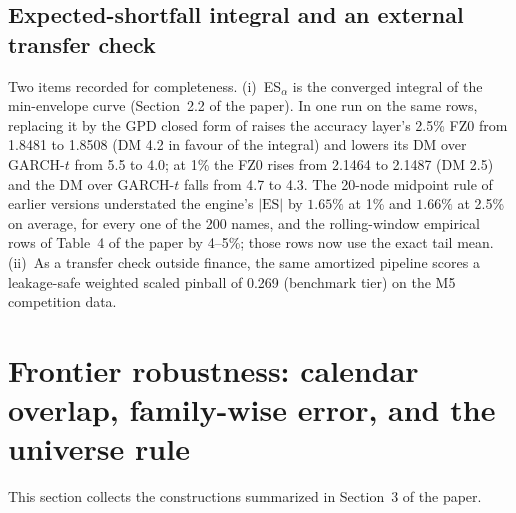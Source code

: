 \documentclass[11pt]{article}
\newcommand{\ES}{\mathrm{ES}}
\begin{document}
\subsection*{Expected-shortfall integral and an external transfer check}
Two items recorded for completeness. (i)~ES$_\alpha$ is the converged integral of the min-envelope curve (Section~2.2 of the paper). In one run on the same rows, replacing it by the GPD closed form of \citet{mcneilfrey2000} raises the accuracy layer's 2.5\% FZ0 from 1.8481 to 1.8508 (DM 4.2 in favour of the integral) and lowers its DM over GARCH-$t$ from 5.5 to 4.0; at 1\% the FZ0 rises from 2.1464 to 2.1487 (DM 2.5) and the DM over GARCH-$t$ falls from 4.7 to 4.3. The 20-node midpoint rule of earlier versions understated the engine's $|\ES|$ by $1.65\%$ at 1\% and $1.66\%$ at 2.5\% on average, for every one of the 200 names, and the rolling-window empirical rows of Table~4 of the paper by 4--5\%; those rows now use the exact tail mean. (ii)~As a transfer check outside finance, the same amortized pipeline scores a leakage-safe weighted scaled pinball of 0.269 (benchmark tier) on the M5 competition data.

\section{Frontier robustness: calendar overlap, family-wise error, and the universe rule}
This section collects the constructions summarized in Section~3 of the paper.
\end{document}
